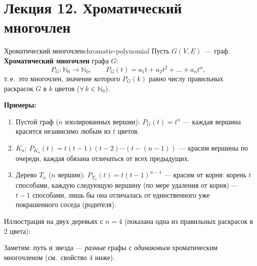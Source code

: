 
\chapter{Лекция 12. Хроматический многочлен}

\begin{defn}{Хроматический многочлен}{chromatic-polynomial}
Пусть $G(V, E)$~--- граф. \textbf{Хроматический многочлен} графа $G$:
\[
  P_G\colon \mathbb{N}_0 \to \mathbb{N}_0, \qquad
  P_G(t) = a_1 t + a_2 t^2 + \ldots + a_n t^n,
\]
т.\,е.\ это многочлен, значение которого $P_G(k)$ равно числу правильных раскрасок $G$ в $k$ цветов ($\forall\, k \in \mathbb{N}_0$).
\end{defn}

\textbf{Примеры:}
\begin{enumerate}
  \item Пустой граф ($n$ изолированных вершин): $P_G(t) = t^n$ ---
        каждая вершина красится независимо любым из $t$ цветов.
  \item $K_n$: $P_{K_n}(t) = t(t-1)(t-2)\cdots(t-(n-1))$ --- красим
        вершины по очереди, каждая обязана отличаться от всех
        предыдущих.
  \item Дерево $T_n$ ($n$ вершин): $P_{T_n}(t) = t(t-1)^{n-1}$ ---
        красим от корня: корень $t$ способами, каждую следующую вершину
        (по мере удаления от корня) --- $t - 1$ способами, лишь бы она
        отличалась от единственного уже покрашенного соседа (родителя).
\end{enumerate}

Иллюстрация на двух деревьях с $n = 4$ (показана одна из правильных
раскрасок в 2 цвета):


Заметим: путь и звезда --- \emph{разные} графы с \emph{одинаковым}
хроматическим многочленом (см.~свойство 4 ниже).

